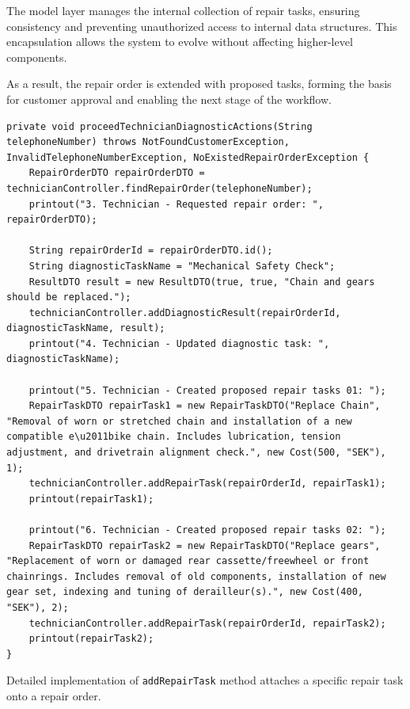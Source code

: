 \documentclass[a4paper]{scrartcl}
\begin{document}
The model layer manages the internal collection of repair tasks, ensuring consistency and preventing unauthorized access to internal data structures. This encapsulation allows the system to evolve without affecting higher-level components.

As a result, the repair order is extended with proposed tasks, forming the basis for customer approval and enabling the next stage of the workflow.

\begin{lstlisting}[style=javastyle, caption={Internal method \texttt{proceedTechnicianDiagnosticActions} in \texttt{View} for proceeding receptionist preparation tasks}]
private void proceedTechnicianDiagnosticActions(String telephoneNumber) throws NotFoundCustomerException, InvalidTelephoneNumberException, NoExistedRepairOrderException {
    RepairOrderDTO repairOrderDTO = technicianController.findRepairOrder(telephoneNumber);
    printout("3. Technician - Requested repair order: ", repairOrderDTO);

    String repairOrderId = repairOrderDTO.id();
    String diagnosticTaskName = "Mechanical Safety Check";
    ResultDTO result = new ResultDTO(true, true, "Chain and gears should be replaced.");
    technicianController.addDiagnosticResult(repairOrderId, diagnosticTaskName, result);
    printout("4. Technician - Updated diagnostic task: ", diagnosticTaskName);

    printout("5. Technician - Created proposed repair tasks 01: ");
    RepairTaskDTO repairTask1 = new RepairTaskDTO("Replace Chain", "Removal of worn or stretched chain and installation of a new compatible e\u2011bike chain. Includes lubrication, tension adjustment, and drivetrain alignment check.", new Cost(500, "SEK"), 1);
    technicianController.addRepairTask(repairOrderId, repairTask1);
    printout(repairTask1);

    printout("6. Technician - Created proposed repair tasks 02: ");
    RepairTaskDTO repairTask2 = new RepairTaskDTO("Replace gears", "Replacement of worn or damaged rear cassette/freewheel or front chainrings. Includes removal of old components, installation of new gear set, indexing and tuning of derailleur(s).", new Cost(400, "SEK"), 2);
    technicianController.addRepairTask(repairOrderId, repairTask2);
    printout(repairTask2);
}
\end{lstlisting}

Detailed implementation of \texttt{addRepairTask} method attaches a specific repair task onto a repair order.
\end{document}
